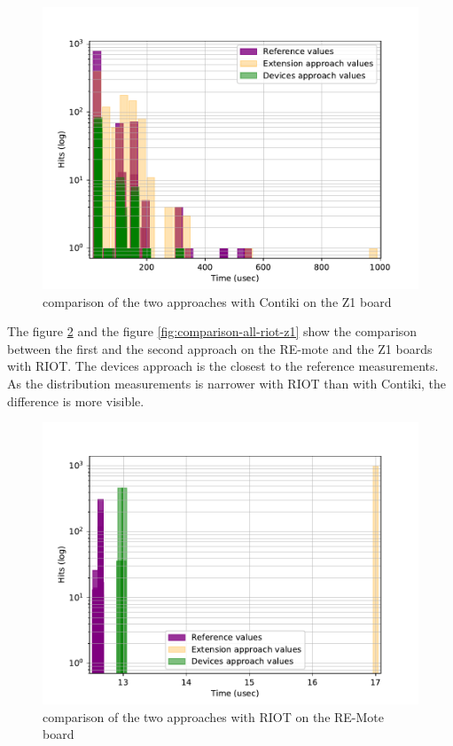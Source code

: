 \begin{figure}[!ht]
  \centering
  \includegraphics[scale=.7]{assets/comparison-all-contiki-z1.pdf}
  \caption{comparison of the two approaches with Contiki on the Z1 board\label{fig:comparison-all-contiki-z1}}
\end{figure}

The figure \ref{fig:comparison-all-riot-remote} and the figure \ref{fig:comparison-all-riot-z1} show the comparison between the first and the second approach on the RE-mote and the Z1 boards with RIOT.
The devices approach is the closest to the reference measurements.
As the distribution measurements is narrower with RIOT than with Contiki, the difference is more visible.

\begin{figure}[!ht]
  \centering
  \includegraphics[scale=.7]{assets/comparison-all-riot-remote.pdf}
  \caption{comparison of the two approaches with RIOT on the RE-Mote board\label{fig:comparison-all-riot-remote}}
\end{figure}

